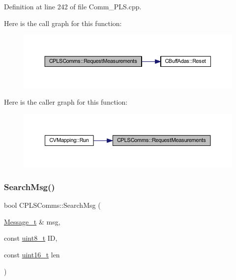 Definition at line 242 of file Comm\+\_\+\+P\+L\+S.\+cpp.

Here is the call graph for this function\+:\nopagebreak
\begin{figure}[H]
\begin{center}
\leavevmode
\includegraphics[width=350pt]{class_c_p_l_s_comms_ab69a49f5c4cd7b4b9f63fa16c7792920_cgraph}
\end{center}
\end{figure}
Here is the caller graph for this function\+:\nopagebreak
\begin{figure}[H]
\begin{center}
\leavevmode
\includegraphics[width=350pt]{class_c_p_l_s_comms_ab69a49f5c4cd7b4b9f63fa16c7792920_icgraph}
\end{center}
\end{figure}
\mbox{\label{class_c_p_l_s_comms_a14754b4119b9a3d613579c2a80220cc0}} 
\subsubsection{\texorpdfstring{SearchMsg()}{SearchMsg()}}
{\footnotesize\ttfamily bool C\+P\+L\+S\+Comms\+::\+Search\+Msg (\begin{DoxyParamCaption}\item[{\mbox{\hyperlink{struct_c_p_l_s_comms_1_1_message__t}{Message\+\_\+t}} \&}]{msg,  }\item[{const \mbox{\hyperlink{_a_d_a_s___types_8h_aba7bc1797add20fe3efdf37ced1182c5}{uint8\+\_\+t}}}]{ID,  }\item[{const \mbox{\hyperlink{_a_d_a_s___types_8h_a1f1825b69244eb3ad2c7165ddc99c956}{uint16\+\_\+t}}}]{len }\end{DoxyParamCaption})}




